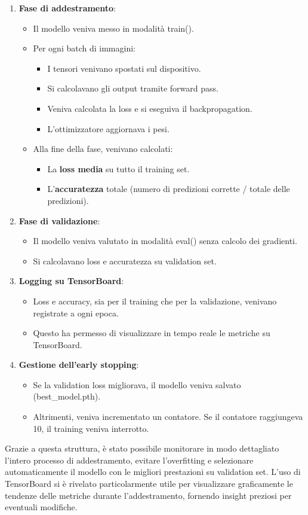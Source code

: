 \documentclass[main.tex]{subfiles}
\begin{document}
\begin{enumerate}
    \item \textbf{Fase di addestramento}:
    \begin{itemize}
        \item Il modello veniva messo in modalità train().
        \item Per ogni batch di immagini:
        \begin{itemize}
            \item I tensori venivano spostati sul dispositivo.
            \item Si calcolavano gli output tramite forward pass.
            \item Veniva calcolata la loss e si eseguiva il backpropagation.
            \item L’ottimizzatore aggiornava i pesi.
        \end{itemize}
        \item Alla fine della fase, venivano calcolati:
        \begin{itemize}
            \item La \textbf{loss media} su tutto il training set.
            \item L’\textbf{accuratezza} totale (numero di predizioni corrette / totale delle predizioni).
        \end{itemize}
    \end{itemize}
    \item \textbf{Fase di validazione}:
    \begin{itemize}
        \item Il modello veniva valutato in modalità eval() senza calcolo dei gradienti.
        \item Si calcolavano loss e accuratezza su validation set.
    \end{itemize}
    \item \textbf{Logging su TensorBoard}:
    \begin{itemize}
        \item Loss e accuracy, sia per il training che per la validazione, venivano registrate a ogni epoca.
        \item Questo ha permesso di visualizzare in tempo reale le metriche su TensorBoard.
    \end{itemize}
    \item \textbf{Gestione dell’early stopping}:
    \begin{itemize}
        \item Se la validation loss migliorava, il modello veniva salvato (best\_model.pth).
        \item Altrimenti, veniva incrementato un contatore. Se il contatore raggiungeva 10, il training veniva interrotto.
    \end{itemize}
\end{enumerate}
Grazie a questa struttura, è stato possibile monitorare in modo dettagliato l’intero processo di addestramento, evitare l’overfitting e selezionare automaticamente il modello con le migliori prestazioni su validation set. L’uso di TensorBoard si è rivelato particolarmente utile per visualizzare graficamente le tendenze delle metriche durante l’addestramento, fornendo insight preziosi per eventuali modifiche.
\end{document}
